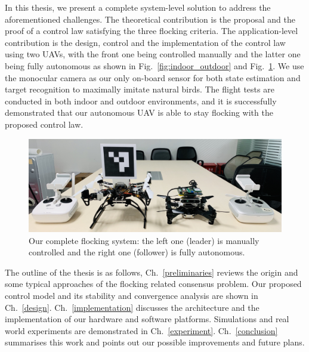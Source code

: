 In this thesis, we present a complete system-level solution to address the aforementioned challenges. The theoretical contribution is the proposal and the proof of a control law satisfying the three flocking criteria. The application-level contribution is the design, control and the implementation of the control law using two UAVs, with the front one being controlled manually and the latter one being fully autonomous as shown in Fig.~\ref{fig:indoor_outdoor} and Fig.~\ref{fig:twin}. We use the monocular camera as our only on-board sensor for both state estimation and target recognition to maximally imitate natural birds. The flight tests are conducted in both indoor and outdoor environments, and it is successfully demonstrated that our autonomous UAV is able to stay flocking with the proposed control law.

\begin{figure}[H]
  \centering
  \includegraphics[width=1\textwidth]{figure/chapter_1/all.jpg}
  \caption{Our complete flocking system: the left one (leader) is manually controlled and the right one (follower) is fully autonomous.}
  \label{fig:twin}
\end{figure}

The outline of the thesis is as follows, Ch.~\ref{preliminaries} reviews the origin and some typical approaches of the flocking related consensus problem. Our proposed control model and its stability and convergence analysis are shown in Ch.~\ref{design}. Ch.~\ref{implementation} discusses the architecture and the implementation of our hardware and software platforms. Simulations and real world experiments are demonstrated in Ch.~\ref{experiment}. Ch.~\ref{conclusion} summarises this work and points out our possible improvements and future plans.

\newpage
